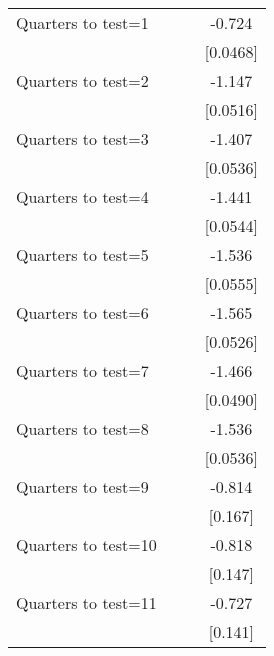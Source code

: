 \begin{longtable}{lccc}
Quarters to test=1  &                     &                     &      -0.724\sym{***}\tabularnewline
                    &                     &                     &    [0.0468]         \tabularnewline
  
Quarters to test=2  &                     &                     &      -1.147\sym{***}\tabularnewline
                    &                     &                     &    [0.0516]         \tabularnewline
  
Quarters to test=3  &                     &                     &      -1.407\sym{***}\tabularnewline
                    &                     &                     &    [0.0536]         \tabularnewline
  
Quarters to test=4  &                     &                     &      -1.441\sym{***}\tabularnewline
                    &                     &                     &    [0.0544]         \tabularnewline
  
Quarters to test=5  &                     &                     &      -1.536\sym{***}\tabularnewline
                    &                     &                     &    [0.0555]         \tabularnewline
  
Quarters to test=6  &                     &                     &      -1.565\sym{***}\tabularnewline
                    &                     &                     &    [0.0526]         \tabularnewline
  
Quarters to test=7  &                     &                     &      -1.466\sym{***}\tabularnewline
                    &                     &                     &    [0.0490]         \tabularnewline
  
Quarters to test=8  &                     &                     &      -1.536\sym{***}\tabularnewline
                    &                     &                     &    [0.0536]         \tabularnewline
  
Quarters to test=9  &                     &                     &      -0.814\sym{***}\tabularnewline
                    &                     &                     &     [0.167]         \tabularnewline
  
Quarters to test=10 &                     &                     &      -0.818\sym{***}\tabularnewline
                    &                     &                     &     [0.147]         \tabularnewline
  
Quarters to test=11 &                     &                     &      -0.727\sym{***}\tabularnewline
                    &                     &                     &     [0.141]         \tabularnewline
  

\end{longtable}
